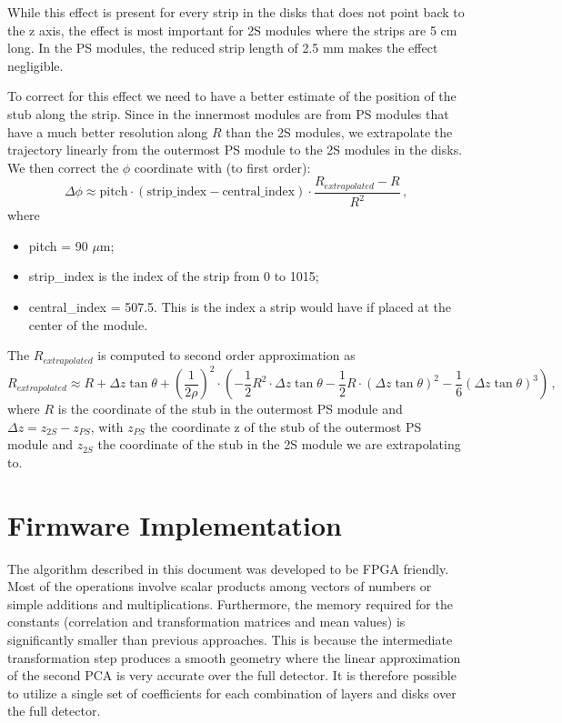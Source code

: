 \documentclass[10pt,a4paper]{report}
\begin{document}
While this effect is present for every strip in the disks that does not point back to the z axis, the effect is most important for 2S modules where the strips are 5 cm long. In the PS modules, the reduced strip length of 2.5 mm makes the effect negligible.

To correct for this effect we need to have a better estimate of the position of the stub along the strip. Since in the innermost modules are from PS modules that have a much better resolution along $R$ than the 2S modules, we extrapolate the trajectory linearly from the outermost PS module to the 2S modules in the disks. We then correct the $\phi$ coordinate with (to first order):
\begin{equation}
\Delta\phi \approx \mbox{pitch} \cdot (\mbox{strip\_index} - \mbox{central\_index}) \cdot \frac{R_{extrapolated} - R}{R^2} \, ,
\end{equation}
where
\begin{itemize}
\item pitch = 90 $\mu$m;
\item strip\_index is the index of the strip from 0 to 1015;
\item central\_index = 507.5. This is the index a strip would have if placed at the center of the module.
\end{itemize}
The $R_{extrapolated}$ is computed to second order approximation as
\begin{equation}
R_{extrapolated} \approx R + \Delta z \tan\theta + \left(\frac{1}{2\rho}\right)^2 \cdot \left(-\frac12R^2 \cdot \Delta z \tan \theta - \frac12 R \cdot (\Delta z\tan \theta)^2 - \frac16 (\Delta z \tan \theta)^3\right) \, ,
\end{equation}
where $R$ is the coordinate of the stub in the outermost PS module and $\Delta z = z_{2S} - z_{PS}$, with $z_{PS}$ the coordinate z of the stub of the outermost PS module and $z_{2S}$ the coordinate of the stub in the 2S module we are extrapolating to.

\section{Firmware Implementation}

The algorithm described in this document was developed to be FPGA friendly. Most of the operations involve scalar products among vectors of numbers or simple additions and multiplications. Furthermore, the memory required for the constants (correlation and transformation matrices and mean values) is significantly smaller than previous approaches. This is because the intermediate transformation step produces a smooth geometry where the linear approximation of the second PCA is very accurate over the full detector. It is therefore possible to utilize a single set of coefficients for each combination of layers and disks over the full detector.
\end{document}
